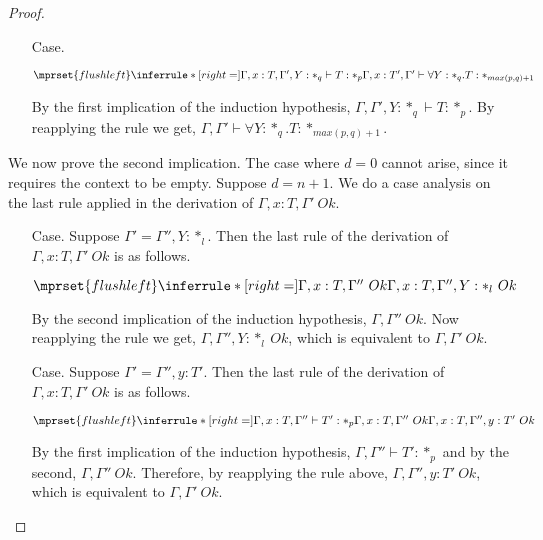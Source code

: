 \begin{proof}
\begin{itemize}
  \item[Case.]\ \\
    \begin{center}
      \begin{math}
        $$\mprset{flushleft}
        \inferrule* [right=] {
          \Gamma,x:T,\Gamma',Y:*_q \vdash T : *_p
        }{\Gamma,x:T',\Gamma' \vdash \forall Y:*_q.T : *_{max(p,q)+1}}
      \end{math}
    \end{center}
    By the first implication of the induction hypothesis, $\Gamma,\Gamma',Y:*_q \vdash T:*_p$.
    By reapplying the rule we get, $\Gamma,\Gamma' \vdash \forall Y:*_q.T:*_{max(p,q)+1}$.
  \end{itemize}

  \noindent We now prove the second implication.
  The case where $d = 0$ cannot arise, since it requires the context to be empty.
  Suppose $d = n + 1$.  We do a case analysis on the last rule applied in the derivation of
  $\Gamma,x:T,\Gamma'\ Ok$.
  \begin{itemize}
  \item[Case.]  Suppose $\Gamma' = \Gamma'',Y:*_l$.  Then the last rule of the derivation of
    $\Gamma,x:T,\Gamma'\ Ok$ is as follows.
    \begin{center}
      \begin{math}
        $$\mprset{flushleft}
        \inferrule* [right=] {
          \Gamma,x:T,\Gamma''\ Ok
        }{\Gamma,x:T,\Gamma'',Y:*_l\ Ok}
      \end{math}
    \end{center}
    By the second implication of the induction hypothesis, $\Gamma,\Gamma''\ Ok$.  Now 
    reapplying the rule we get, $\Gamma,\Gamma'',Y:*_l\ Ok$, which is equivalent to 
    $\Gamma,\Gamma'\ Ok$.
    
  \item[Case.]  Suppose $\Gamma' = \Gamma'',y:T'$.  Then the last rule of the derivation of
    $\Gamma,x:T,\Gamma'\ Ok$ is as follows.
    \begin{center}
      \begin{math}
        $$\mprset{flushleft}
        \inferrule* [right=] {
          \Gamma,x:T,\Gamma'' \vdash T':*_p
          \\
          \Gamma,x:T,\Gamma''\ Ok
        }{\Gamma,x:T,\Gamma'',y :T'\ Ok}
      \end{math} 
    \end{center}
    By the first implication of the induction hypothesis, $\Gamma,\Gamma'' \vdash T':*_p$ and 
    by the second, $\Gamma,\Gamma''\ Ok$.
    Therefore, by reapplying the rule above, $\Gamma,\Gamma'',y:T'\ Ok$, which is equivalent 
    to $\Gamma,\Gamma'\ Ok$.
  \end{itemize}
\end{proof}


